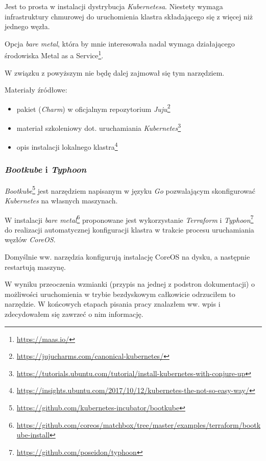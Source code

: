 \documentclass[a4paper,12pt,twoside,openany]{report}
\providecommand{\tightlist}{%
  \setlength{\itemsep}{0pt}\setlength{\parskip}{0pt}}
\DeclareRobustCommand{\href}[2]{#2\footnote{\url{#1}}}
\begin{document}
Jest to prosta w instalacji dystrybucja \emph{Kubernetesa}. Niestety
wymaga infrastruktury chmurowej do uruchomienia klastra składającego się
z więcej niż jednego węzła.

Opcja \emph{bare metal}, która by mnie interesowała nadal wymaga
działającego środowiska \href{https://maas.io/}{Metal as a Service}.

W związku z powyższym nie będę dalej zajmował się tym narzędziem.

Materiały źródłowe:

\begin{itemize}
\tightlist
\item
  \href{https://jujucharms.com/canonical-kubernetes/}{pakiet
  (\emph{Charm}) w oficjalnym repozytorium \emph{Juju}}
\item
  \href{https://tutorials.ubuntu.com/tutorial/install-kubernetes-with-conjure-up}{materiał
  szkoleniowy dot. uruchamiania \emph{Kubernetes}}
\item
  \href{https://insights.ubuntu.com/2017/10/12/kubernetes-the-not-so-easy-way/}{opis
  instalacji lokalnego klastra}
\end{itemize}

\hypertarget{bootkube-i-typhoon}{%
\subsubsection{\texorpdfstring{\emph{Bootkube} i
\emph{Typhoon}}{Bootkube i Typhoon}}\label{bootkube-i-typhoon}}

\href{https://github.com/kubernetes-incubator/bootkube}{\emph{Bootkube}}
jest narzędziem napisanym w języku \emph{Go} pozwalającym skonfigurować
\emph{Kubernetes} na własnych maszynach.

W instalacji
\href{https://github.com/coreos/matchbox/tree/master/examples/terraform/bootkube-install}{\emph{bare
metal}} proponowane jest wykorzystanie \emph{Terraform} i
\href{https://github.com/poseidon/typhoon}{\emph{Typhoon}} do realizacji
automatycznej konfiguracji klastra w trakcie procesu uruchamiania węzłów
\emph{CoreOS}.

Domyślnie ww. narzędzia konfigurują instalację CoreOS na dysku, a
następnie restartują maszynę.

W wyniku przeoczenia wzmianki (przypis na jednej z podstron
dokumentacji) o możliwości uruchomienia w trybie bezdyskowym całkowicie
odrzuciłem to narzędzie. W końcowych etapach pisania pracy znalazłem ww.
wpis i zdecydowałem się zawrzeć o nim informację.
\end{document}
